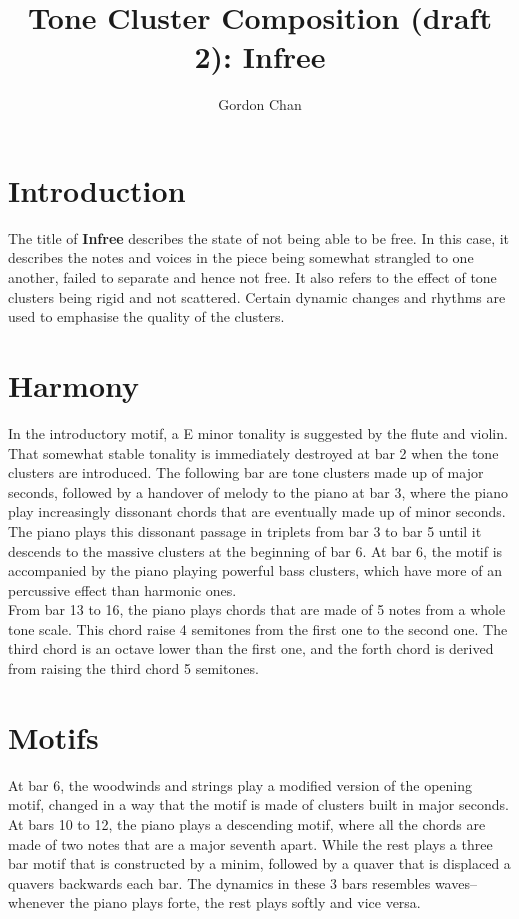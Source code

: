 \documentclass[a4paper]{article}
\title{Tone Cluster Composition (draft 2): \textbf{Infree}}
\author{Gordon Chan}
\begin{document}
\maketitle
\section{Introduction}

The title of \textbf{Infree} describes the state of not being able to be free.
In this case, it describes the notes and voices in the piece being somewhat
strangled to one another, failed to separate and hence not free.
It also refers to the effect of tone clusters being rigid and not
scattered. Certain dynamic changes and rhythms are used to emphasise
the quality of the clusters.

\section{Harmony}

In the introductory motif,
a E minor tonality is suggested by the flute and violin.
That somewhat stable tonality is immediately destroyed at bar 2
when the tone clusters are introduced.
The following bar are tone clusters made up of major seconds,
followed by a handover of melody to the piano at bar 3,
where the piano play increasingly dissonant chords that are
eventually made up of minor seconds.\\

The piano plays this dissonant passage in triplets from bar 3 to bar 5
until it descends to the massive clusters at the beginning of bar 6.
At bar 6, the motif is accompanied by the piano playing powerful bass clusters,
which have more of an percussive effect than harmonic ones.\\

From bar 13 to 16, the piano plays chords that are made of 5 notes from
a whole tone scale. This chord raise 4 semitones from the first one
to the second one. The third chord is an octave lower than the first one,
and the forth chord is derived from raising the third chord 5 semitones.

\section{Motifs}


At bar 6, the woodwinds and strings play a modified version
of the opening motif, changed in a way that the motif
is made of clusters built in major seconds.
At bars 10 to 12, the piano plays a descending motif,
where all the chords are made of two notes that are a major seventh apart.
While the rest plays a three bar motif that is constructed by a minim,
followed by a quaver that is displaced a quavers backwards each bar.
The dynamics in these 3 bars resembles waves--whenever the piano plays forte,
the rest plays softly and vice versa.\\
\end{document}
